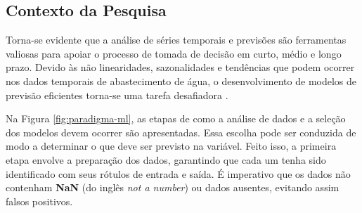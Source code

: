 \subsection{Contexto da Pesquisa} \label{subsec:contexto}
%

Torna-se evidente que a análise de séries temporais e previsões são ferramentas valiosas para apoiar o processo de tomada de decisão em curto, médio e longo prazo. Devido às não linearidades, sazonalidades e tendências que podem ocorrer nos dados temporais de abastecimento de água, o desenvolvimento de modelos de previsão eficientes torna-se uma tarefa desafiadora \cite{mateus}.

Na Figura \ref{fig:paradigma-ml}, as etapas de como a análise de dados e a seleção dos modelos devem ocorrer são apresentadas. Essa escolha pode ser conduzida de modo a determinar o que deve ser previsto na variável. Feito isso, a primeira etapa envolve a preparação dos dados, garantindo que cada um tenha sido identificado com seus rótulos de entrada e saída. É imperativo que os dados não contenham \textbf{NaN} (do inglês \textit{not a number}) ou dados ausentes, evitando assim falsos positivos.

